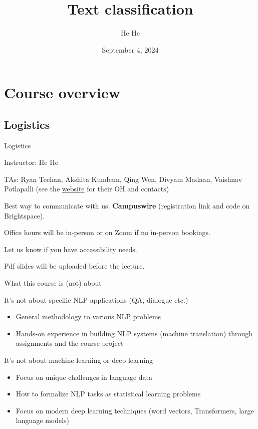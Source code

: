\documentclass[usenames,dvipsnames,notes,11pt,aspectratio=169]{beamer}
\title[DS-GA.1011]{Text classification}
\author[He He]{He He
}
\institute[NYU]{
    \texttt{[image: ../figures/nyu-logo]}\\
}
\date{September 4, 2024}
\begin{document}
\begin{frame}
\titlepage
\end{frame}

\section{Course overview}

\subsection{Logistics}
\begin{frame}
{Logistics}
    \begin{wideitemize}
        \item Instructor: He He
        \item TAs: Ryan Teehan, Akshita Kumbam, Qing Wen, Divyam Madaan, Vaishnav Potlapalli (see the \href{https://nyu-cs2590.github.io/fall2024/}{website} for their OH and contacts)
        \item Best way to communicate with us: \textbf{Campuswire} (registration link and code on Brightspace).
        \item Office hours will be in-person or on Zoom if no in-person bookings.
        \item Let us know if you have accessibility needs.
        \item Pdf slides will be uploaded before the lecture.
    \end{wideitemize}
\end{frame}

\begin{frame}
    {What this course is (not) about}
    \begin{wideitemize}
        \item It's not about specific NLP applications (QA, dialogue etc.)
            \begin{itemize}
        \item General methodology to various NLP problems
        \item Hands-on experience in building NLP systems (\eg machine translation) through assignments and the course project
            \end{itemize}

            \pause
        \item It's not about machine learning or deep learning
            \begin{itemize}
        \item Focus on unique challenges in language data
        \item How to formalize NLP tasks as statistical learning problems
        \item Focus on modern deep learning techniques (\eg word vectors, Transformers, large language models)
            \end{itemize}
    \end{wideitemize}
\end{frame}
\end{document}
